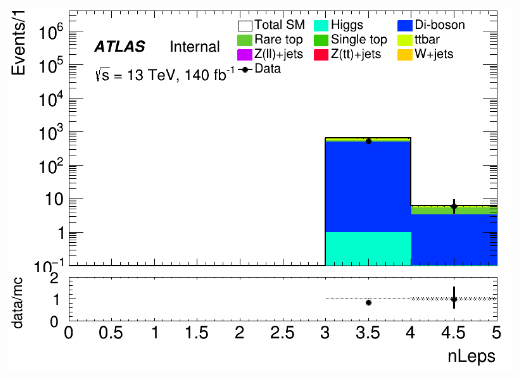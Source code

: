 \documentclass[usenames,dvipsnames]{beamer}
\begin{document}
\begin{frame}
\begin{minipage}{0.32\textwidth}
        \includegraphics[width=\textwidth]{graphics/LLL_met/LLL_met_nLeps.png}
    \end{minipage}
    
    \vspace{0.5cm} %


\end{frame}
\end{document}
